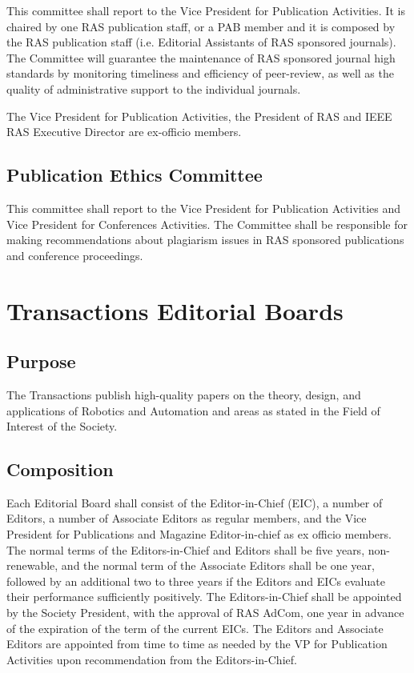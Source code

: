 \documentclass[10pt]{article}
\begin{document}
This committee shall report to the Vice President for Publication Activities. It is chaired by one RAS publication staff, or a PAB member and it is composed by the RAS publication staff (i.e. Editorial Assistants of RAS sponsored journals). The Committee will guarantee the maintenance of RAS sponsored journal high standards by monitoring timeliness and efficiency of peer-review, as well as the quality of administrative support to the individual journals.

The Vice President for Publication Activities, the President of RAS and IEEE RAS Executive Director are ex-officio members.


\subsection{Publication Ethics Committee}

This committee shall report to the Vice President for Publication Activities and Vice President for Conferences Activities. The Committee shall be responsible for making recommendations about plagiarism issues in RAS sponsored publications and conference proceedings.


\section{Transactions Editorial Boards}
\label{TEB}

\subsection{Purpose}

The Transactions publish high-quality papers on the theory, design, and applications of Robotics and Automation and areas as stated in the Field of Interest of the Society.

\subsection{Composition}
\label{TEB:Composition}
Each Editorial Board shall consist of the Editor-in-Chief (EIC), a number of Editors, a number of Associate Editors as regular members, and the Vice President for Publications and Magazine Editor-in-chief as ex officio members.  The normal terms of the Editors-in-Chief and Editors shall be five years, non-renewable, and the normal term of the Associate Editors shall be one year, followed by an additional two to three years if the Editors and EICs evaluate their performance sufficiently positively. The Editors-in-Chief shall be appointed by the Society President, with the approval of RAS AdCom, one year in advance of the expiration of the term of the current EICs. The Editors and Associate Editors are appointed from time to time as needed by the VP for Publication Activities upon recommendation from the Editors-in-Chief.
\end{document}
